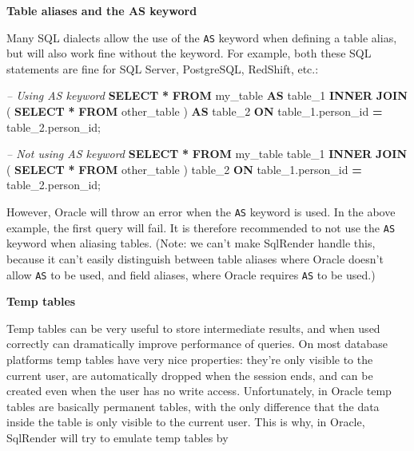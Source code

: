 \documentclass[11pt]{book}
\newenvironment{Shaded}{\begin{snugshade}}{\end{snugshade}}
\newcommand{\CommentTok}[1]{\textcolor[rgb]{0.56,0.35,0.01}{\textit{#1}}}
\newcommand{\KeywordTok}[1]{\textcolor[rgb]{0.13,0.29,0.53}{\textbf{#1}}}
\newcommand{\NormalTok}[1]{#1}
\newcommand{\OperatorTok}[1]{\textcolor[rgb]{0.81,0.36,0.00}{\textbf{#1}}}
\theoremstyle{definition}
\theoremstyle{definition}
\theoremstyle{definition}
\theoremstyle{remark}
\begin{document}
\textbf{Table aliases and the AS keyword}

Many SQL dialects allow the use of the \texttt{AS} keyword when defining a table alias, but will also work fine without the keyword. For example, both these SQL statements are fine for SQL Server, PostgreSQL, RedShift, etc.:

\begin{Shaded}
\begin{Highlighting}[]
\CommentTok{-- Using AS keyword}
\KeywordTok{SELECT} \OperatorTok{*} 
\KeywordTok{FROM}\NormalTok{ my_table }\KeywordTok{AS}\NormalTok{ table_1}
\KeywordTok{INNER} \KeywordTok{JOIN}\NormalTok{ (}
  \KeywordTok{SELECT} \OperatorTok{*} \KeywordTok{FROM}\NormalTok{ other_table}
\NormalTok{) }\KeywordTok{AS}\NormalTok{ table_2}
\KeywordTok{ON}\NormalTok{ table_1.person_id }\OperatorTok{=}\NormalTok{ table_2.person_id;}

\CommentTok{-- Not using AS keyword}
\KeywordTok{SELECT} \OperatorTok{*} 
\KeywordTok{FROM}\NormalTok{ my_table table_1}
\KeywordTok{INNER} \KeywordTok{JOIN}\NormalTok{ (}
  \KeywordTok{SELECT} \OperatorTok{*} \KeywordTok{FROM}\NormalTok{ other_table}
\NormalTok{) table_2}
\KeywordTok{ON}\NormalTok{ table_1.person_id }\OperatorTok{=}\NormalTok{ table_2.person_id;}
\end{Highlighting}
\end{Shaded}

However, Oracle will throw an error when the \texttt{AS} keyword is used. In the above example, the first query will fail. It is therefore recommended to not use the \texttt{AS} keyword when aliasing tables. (Note: we can't make SqlRender handle this, because it can't easily distinguish between table aliases where Oracle doesn't allow \texttt{AS} to be used, and field aliases, where Oracle requires \texttt{AS} to be used.)

\textbf{Temp tables}

Temp tables can be very useful to store intermediate results, and when used correctly can dramatically improve performance of queries. On most database platforms temp tables have very nice properties: they're only visible to the current user, are automatically dropped when the session ends, and can be created even when the user has no write access. Unfortunately, in Oracle temp tables are basically permanent tables, with the only difference that the data inside the table is only visible to the current user. This is why, in Oracle, SqlRender will try to emulate temp tables by
\end{document}
